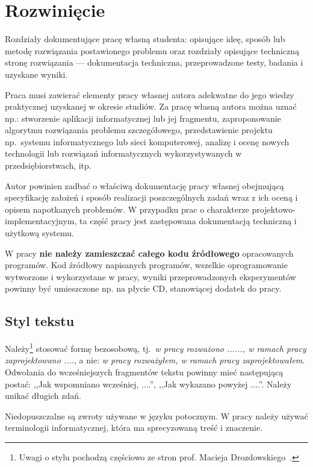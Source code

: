 
\chapter{Rozwinięcie}

Rozdziały dokumentujące pracę własną studenta: opisujące ideę, sposób lub metodę 
rozwiązania postawionego problemu oraz rozdziały opisujące techniczną stronę rozwiązania 
--- dokumentacja techniczna, przeprowadzone testy, badania i uzyskane wyniki. 

Praca musi zawierać elementy pracy własnej autora adekwatne do jego wiedzy praktycznej uzyskanej w
okresie studiów. Za pracę własną autora można uznać np.: stworzenie aplikacji informatycznej lub jej
fragmentu, zaproponowanie algorytmu rozwiązania problemu szczegółowego, przedstawienie projektu 
np.~systemu informatycznego lub sieci komputerowej, analizę i ocenę nowych technologii lub rozwiązań
informatycznych wykorzystywanych w przedsiębiorstwach, itp. 

Autor powinien zadbać o właściwą dokumentację pracy własnej obejmującą specyfikację założeń i 
sposób realizacji poszczególnych zadań
wraz z ich oceną i opisem napotkanych problemów. W przypadku prac o charakterze 
projektowo-implementacyjnym, ta część pracy jest zastępowana dokumentacją techniczną i użytkową systemu. 

W pracy \textbf{nie należy zamieszczać całego kodu źródłowego} opracowanych programów. Kod źródłowy napisanych
programów, wszelkie oprogramowanie wytworzone i wykorzystane w pracy, wyniki przeprowadzonych
eksperymentów powinny być umieszczone np. na płycie CD, stanowiącej dodatek do pracy.

\section*{Styl tekstu}

Należy\footnote{Uwagi o stylu pochodzą częściowo ze stron prof. Macieja Drozdowskiego~\cite{Drozdowski2006}.} 
stosować formę bezosobową, tj.~\emph{w pracy rozważono ......, 
w ramach pracy zaprojektowano ....}, a nie: \emph{w pracy rozważyłem, w ramach pracy zaprojektowałem}. 
Odwołania do wcześniejszych fragmentów tekstu powinny mieć następującą postać: ,,Jak wspomniano wcześniej, ....'', 
,,Jak wykazano powyżej ....''. Należy unikać długich zdań. 

Niedopuszczalne są zwroty używane w języku potocznym. W pracy należy używać terminologii informatycznej, która ma 
sprecyzowaną treść i znaczenie. 

